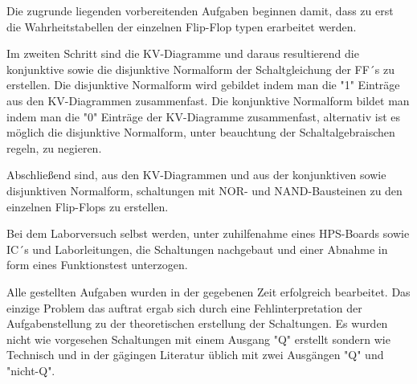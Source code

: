 Die zugrunde liegenden vorbereitenden Aufgaben beginnen damit, dass zu erst die Wahrheitstabellen
der einzelnen Flip-Flop typen erarbeitet werden. \par
Im zweiten Schritt sind die KV-Diagramme und daraus resultierend die konjunktive sowie die disjunktive 
Normalform der Schaltgleichung der FF´s zu erstellen.
Die disjunktive Normalform wird gebildet indem man die "1" Einträge aus den KV-Diagrammen zusammenfast.
Die konjunktive Normalform bildet man indem man die "0" Einträge der KV-Diagramme zusammenfast, 
alternativ ist es möglich die disjunktive Normalform, unter beauchtung der Schaltalgebraischen regeln, zu negieren.\par
Abschließend sind, aus den KV-Diagrammen und aus der konjunktiven sowie disjunktiven Normalform, schaltungen mit NOR- 
und NAND-Bausteinen zu den einzelnen Flip-Flops zu erstellen.\par
Bei dem Laborversuch selbst werden, unter zuhilfenahme eines HPS-Boards sowie IC´s und Laborleitungen, die Schaltungen nachgebaut und einer Abnahme in form eines Funktionstest unterzogen.\par
Alle gestellten Aufgaben wurden in der gegebenen Zeit erfolgreich bearbeitet.
Das einzige Problem das auftrat ergab sich durch eine Fehlinterpretation der Aufgabenstellung zu der theoretischen 
erstellung der Schaltungen. 
Es wurden nicht wie vorgesehen Schaltungen mit einem Ausgang "Q" erstellt sondern wie 
Technisch und in der gägingen Literatur üblich mit zwei Ausgängen "Q" und "nicht-Q".